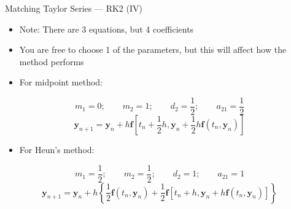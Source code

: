 \documentclass[serif]{beamer}
\begin{document}
\begin{frame}{Matching Taylor Series --- RK2 (IV)}
  \begin{itemize}
  \item<1-> \alert{Note:} There are 3 equations, but 4 coefficients
  \item<1-> You are free to choose 1 of the parameters, but this will affect how the method performs
  \vfill
  \item<1-> For midpoint method:
  \end{itemize}
  \begin{equation}
   \nonumber
    m_1 = 0;\qquad m_2 = 1;\qquad d_2 = \frac{1}{2};\qquad a_{21} = \frac{1}{2}
  \end{equation}
  \begin{equation}
   \nonumber
   \mathbf{y}_{n+1} = \mathbf{y}_n + h\mathbf{f}\left[t_n + \frac{1}{2}h,\mathbf{y}_n + \frac{1}{2}h\mathbf{f}\left(t_n,\mathbf{y}_n\right)\right]
  \end{equation}
  \begin{itemize}
  \vfill
  \item<1-> For Heun's method:
  \end{itemize}
  \begin{equation}
   \nonumber
    m_1 = \frac{1}{2};\qquad m_2 = \frac{1}{2};\qquad d_2 = 1;\qquad a_{21} = 	1
  \end{equation}
  \begin{equation}
   \nonumber
   \mathbf{y}_{n+1} = \mathbf{y}_n + h\left\{\frac{1}{2}\mathbf{f}\left(t_n,\mathbf{y}_n\right)+ \frac{1}{2}\mathbf{f}\left[t_n + h,\mathbf{y}_n + h\mathbf{f}\left(t_n,\mathbf{y}_n\right)\right]\right\}
  \end{equation}
\end{frame}
\end{document}
